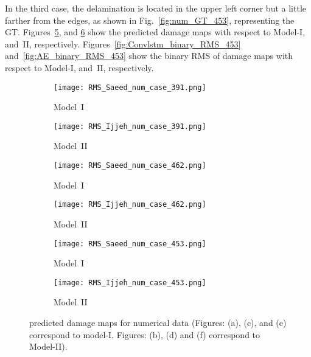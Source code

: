 \begin{sloppypar}
	
	In the third case, the delamination is located in the upper left corner but a little farther from the edges, as shown in Fig.~\ref{fig:num_GT_453}, representing the GT. 
	Figures~\ref{fig:Convlstm_num_453}, and \ref{fig:AE_num_453} show the predicted damage maps with respect to Model-I, and~II, respectively.
	Figures~\ref{fig:Convlstm_binary_RMS_453} and~\ref{fig:AE_binary_RMS_453} show the binary RMS of damage maps with respect to Model-I, and~II, respectively.
	
	\begin{figure} [!ht]
		\centering
		\begin{subfigure}[b]{0.48\textwidth}
			\centering
			\texttt{[image: RMS\_Saeed\_num\_case\_391.png]} 
			\caption{Model~I}
			\label{fig:Convlstm_num_391}
		\end{subfigure}
		\hfill
		\begin{subfigure}[b]{0.48\textwidth}
			\centering
			\texttt{[image: RMS\_Ijjeh\_num\_case\_391.png]}
			\caption{Model~II}
			\label{fig:AE_num_391}
		\end{subfigure}
		\par\medskip
		\begin{subfigure}[b]{0.48\textwidth}
			\centering
			\texttt{[image: RMS\_Saeed\_num\_case\_462.png]}
			\caption{Model~I}
			\label{fig:Convlstm_num_462}
		\end{subfigure}
		\hfill
		\begin{subfigure}[b]{0.48\textwidth}
			\centering
			\texttt{[image: RMS\_Ijjeh\_num\_case\_462.png]}
			\caption{Model~II}
			\label{fig:AE_num_462}
		\end{subfigure}
		\par\medskip
		\begin{subfigure}[b]{0.48\textwidth}
			\centering
			\texttt{[image: RMS\_Saeed\_num\_case\_453.png]}
			\caption{Model~I}
			\label{fig:Convlstm_num_453}
		\end{subfigure}
		\hfill	
		\begin{subfigure}[b]{0.48\textwidth}
			\centering
			\texttt{[image: RMS\_Ijjeh\_num\_case\_453.png]}
			\caption{Model~II}
			\label{fig:AE_num_453}
		\end{subfigure}
		\caption{predicted damage maps for numerical data (Figures: (a), (c), and (e) correspond to model-I. 
			Figures: (b), (d) and (f) correspond to Model-II).}
		\label{fig:num_case}
	\end{figure} 
	

\end{sloppypar}
